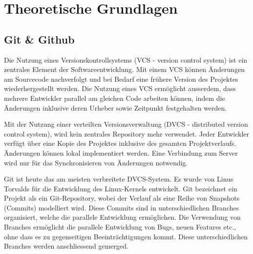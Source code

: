 

\label{Chapter3} %


\chapter{Theoretische Grundlagen} %

\label{Chapter2} %


\section{Git \& Github}
Die Nutzung eines Versionskontrollsystems (VCS - version control system) ist ein zentrales Element der Softwareentwicklung. Mit einem VCS können Änderungen am Sourcecode nachverfolgt und bei Bedarf eine frühere Version des Projektes wiederhergestellt werden. Die Nutzung eines VCS ermöglicht ausserdem, dass mehrere Entwickler parallel am gleichen Code arbeiten können, indem die Änderungen inklusive deren Urheber sowie Zeitpunkt festgehalten werden. 

Mit der Nutzung einer verteilten Versionsverwaltung (DVCS - distributed version control system), wird kein zentrales Repository mehr verwendet. Jeder Entwickler verfügt über eine Kopie des Projektes inklusive des gesamten Projektverlaufs. Änderungen können lokal implementiert werden. Eine Verbindung zum Server wird nur für das Synchronisieren von Änderungen notwendig. \parencite{noauthor_informationen_2025} 

Git ist heute das am meisten verbreitete DVCS-System. Es wurde von Linus Torvalds für die Entwicklung des Linux-Kernels entwickelt. \parencite{zack_git_2018} Git bezeichnet ein Projekt als ein Git-Repository, wobei der Verlauf als eine Reihe von Snapshots (Commits) modelliert wird. Diese Commits sind in unterschiedlichen Branches organisiert, welche die parallele Entwicklung ermöglichen. Die Verwendung von Branches ermöglicht die parallele Entwicklung von Bugs, neuen Features etc., ohne dass es zu gegenseitigen Beeinträchtigungen kommt. Diese unterschiedlichen Branches werden anschliessend gemerged. 

